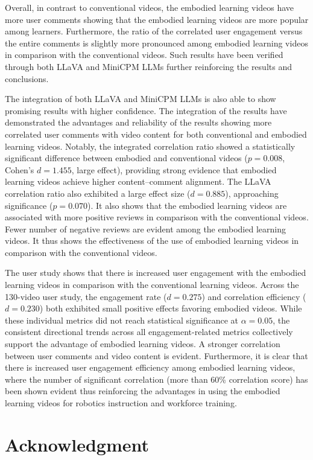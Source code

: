 \documentclass[12pt]{article}
\begin{document}
Overall, in contrast to conventional videos, the embodied learning videos have more user comments showing that the embodied learning videos are more popular among learners. Furthermore, the ratio of the correlated user engagement versus the entire comments is slightly more pronounced among embodied learning videos in comparison with the conventional videos. Such results have been verified through both LLaVA and MiniCPM LLMs further reinforcing the results and conclusions.  

The integration of both LLaVA and MiniCPM LLMs is also able to show promising results with higher confidence. The integration of the results have demonstrated the advantages and reliability of the results showing more correlated user comments with video content for both conventional and embodied learning videos. Notably, the integrated correlation ratio showed a statistically significant difference between embodied and conventional videos ($p = 0.008$, Cohen's $d = 1.455$, large effect), providing strong evidence that embodied learning videos achieve higher content--comment alignment. The LLaVA correlation ratio also exhibited a large effect size ($d = 0.885$), approaching significance ($p = 0.070$). It also shows that the embodied learning videos are associated with more positive reviews in comparison with the conventional videos. Fewer number of negative reviews are evident among the embodied learning videos. It thus shows the effectiveness of the use of embodied learning videos in comparison with the conventional videos.  

The user study shows that there is increased user engagement with the embodied learning videos in comparison with the conventional learning videos. Across the 130-video user study, the engagement rate ($d = 0.275$) and correlation efficiency ($d = 0.230$) both exhibited small positive effects favoring embodied videos. While these individual metrics did not reach statistical significance at $\alpha = 0.05$, the consistent directional trends across all engagement-related metrics collectively support the advantage of embodied learning videos. A stronger correlation between user comments and video content is evident. Furthermore, it is clear that there is increased user engagement efficiency among embodied learning videos, where the number of significant correlation (more than 60\% correlation score) has been shown evident thus reinforcing the advantages in using the embodied learning videos for robotics instruction and workforce training.  

\section*{Acknowledgment}
\end{document}
